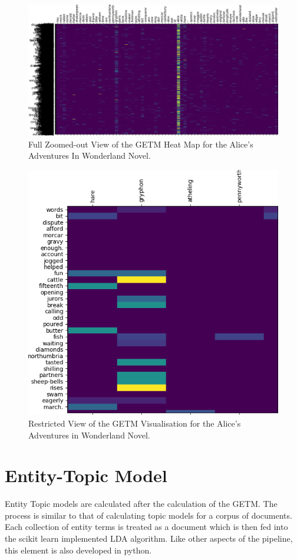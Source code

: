 \documentclass[10pt]{report}
\begin{document}
\begin{figure}[h!]
  \centering
  \includegraphics[scale=0.3]{getm_clutter}
  \caption{Full Zoomed-out View of the GETM Heat Map for the Alice's Adventures In Wonderland Novel.\label{fig:getm_visualisation}}
\end{figure}

\begin{figure}[h!]
  \centering
  \includegraphics[scale=0.4]{getm_reduced}
  \caption{Restricted View of the GETM Visualisation for the Alice's Adventures in Wonderland Novel.\label{fig:getm_vis_reduced}}
\end{figure}


\section{Entity-Topic Model}
Entity Topic models are calculated after the calculation of the GETM. The process is similar to that of calculating topic models for a corpus of documents. Each collection of entity terms is treated as a document which is then fed into the scikit learn implemented LDA algorithm. Like other aspects of the pipeline, this element is also developed in python.
\end{document}
